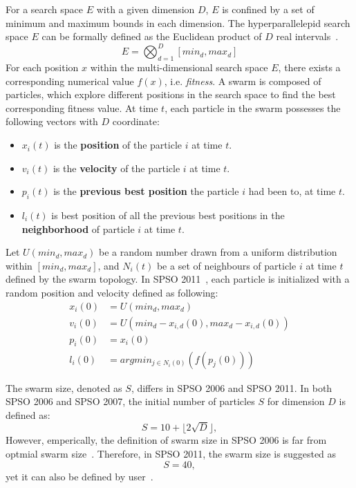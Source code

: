 For a search space $E$ with a given dimension $D$, $E$ is confined by a set of minimum and maximum bounds in each dimension.
The hyperparallelepid search space $E$ can be formally defined as the Euclidean product of $D$ real intervals~\cite{Clerc:2012:SPSO2011}.
\begin{displaymath}
E = \bigotimes_{d=1}^{D}[min_d, max_d]
\end{displaymath}
For each position $x$ within the multi-dimensional search space $E$, there exists a corresponding numerical value $f(x)$, i.e. \textit{fitness}.
A swarm is composed of particles, which explore different positions in the search space to find the best corresponding fitness value.
At time $t$, each particle in the swarm possesses the following vectors with $D$ coordinate:
\begin{itemize}
\item $x_i(t)$ is the \textbf{position} of the particle $i$ at time $t$.
\item $v_i(t)$ is the \textbf{velocity} of the particle $i$ at time $t$.
\item $p_i(t)$ is the \textbf{previous best position} the particle $i$ had been to, at time $t$.
\item $l_i(t)$ is best position of all the previous best positions in the \textbf{neighborhood} of particle $i$ at time $t$.
\end{itemize}

Let $U(min_d, max_d)$ be a random number drawn from a uniform distribution within $[min_d, max_d]$, 
and $N_i(t)$ be a set of neighbours of particle $i$ at time $t$ defined by the swarm topology.
In SPSO 2011~\cite{Clerc:2012:SPSO2011}, each particle is initialized with a random position and velocity defined as following:
\begin{align*}
x_i(0) &= U(min_d, max_d) \\
v_i(0) &= U(min_d - x_{i,d}(0), max_d - x_{i,d}(0)) \\
p_i(0) &= x_i(0) \\ 
l_i(0) &= argmin_{j \in N_i(0)}(f(p_j(0)))
\end{align*}


The swarm size, denoted as $S$, differs in SPSO 2006 and SPSO 2011.
In both SPSO 2006 and SPSO 2007, the initial number of particles $S$ for dimension $D$ is defined as:
\begin{displaymath}
S = 10 + \lfloor 2\sqrt{D} \rfloor,
\end{displaymath}
However, emperically, the definition of swarm size in SPSO 2006 is far from optmial swarm size~\cite{Clerc:2012:SPSO2011}.
Therefore, in SPSO 2011, the swarm size is suggested as
\begin{displaymath}
S = 40,
\end{displaymath}
yet it can also be defined by user~\cite{Clerc:2012:SPSO2011}.


